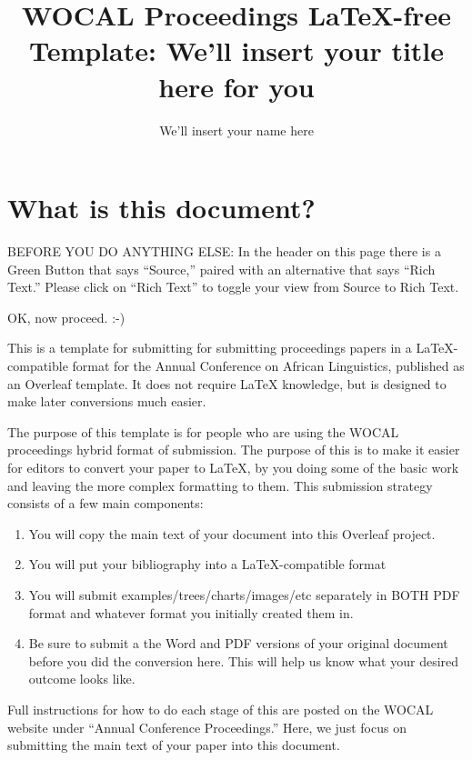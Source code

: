 \documentclass[output=paper,colorlinks,citecolor=brown,
]{langscibook}
\author{We'll insert your name here\affiliation{We'll insert your affiliation here}}
\title{WOCAL Proceedings LaTeX-free Template: We'll insert your title here for you}
\begin{document}
\maketitle


\section{What is this document?}

BEFORE YOU DO ANYTHING ELSE: In the header on this page there is a Green Button that says ``Source,'' paired with an alternative that says ``Rich Text.'' Please click on ``Rich Text'' to toggle your view from Source to Rich Text. 

OK, now proceed. :-) 

This is a template for submitting for submitting proceedings papers in a LaTeX-compatible format for the Annual Conference on African Linguistics, published as an Overleaf template. It does not require LaTeX knowledge, but is designed to make later conversions much easier.

The purpose of this template is for people who are using the WOCAL proceedings hybrid format of submission. The purpose of this is to make it easier for editors to convert your paper to LaTeX, by you doing some of the basic work and leaving the more complex formatting to them. This submission strategy consists of a few main components: 
\begin{enumerate}
\item You will copy the main text of your document into this Overleaf project. 
\item You will put your bibliography into a LaTeX-compatible format
\item You will submit examples/trees/charts/images/etc separately in BOTH PDF format and whatever format you initially created them in. 
\item Be sure to submit a the Word and PDF versions of your original document before you did the conversion here. This will help us know what your desired outcome looks like. 

\end{enumerate}
Full instructions for how to do each stage of this are posted on the WOCAL website under ``Annual Conference Proceedings.'' Here, we just focus on submitting the main text of your paper into this document.
\end{document}
